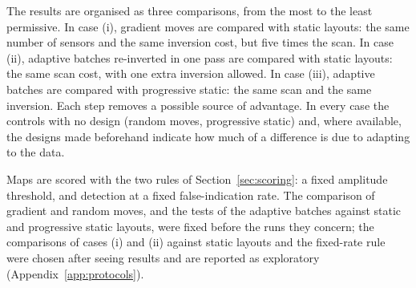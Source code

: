 The results are organised as three comparisons, from the most to the least permissive. In case (i), gradient moves
are compared with static layouts: the same number of sensors and the same inversion cost, but five times the scan.
In case (ii), adaptive batches re-inverted in one pass are compared with static layouts: the same scan cost, with
one extra inversion allowed. In case (iii), adaptive batches are compared with progressive static: the same scan and
the same inversion. Each step removes a possible source of advantage. In every case the controls with no design
(random moves, progressive static) and, where available, the designs made beforehand indicate how much of a
difference is due to adapting to the data.

Maps are scored with the two rules of Section~\ref{sec:scoring}: a fixed amplitude threshold, and detection at a
fixed false-indication rate. The comparison of gradient and random moves, and the tests of the adaptive batches
against static and progressive static layouts, were fixed before the runs they concern; the comparisons of cases (i)
and (ii) against static layouts and the fixed-rate rule were chosen after seeing results and are reported as
exploratory (Appendix~\ref{app:protocols}).
